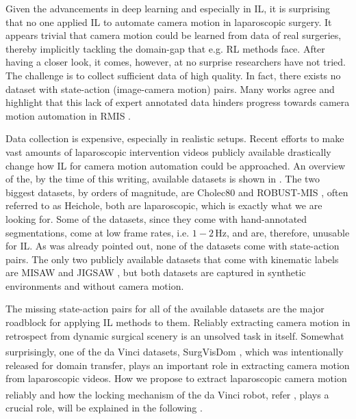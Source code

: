 Given the advancements in deep learning and especially in IL, it is surprising that no one applied IL to automate camera motion in laparoscopic surgery. It appears trivial that camera motion could be learned from data of real surgeries, thereby implicitly tackling the domain-gap that e.g. RL methods face. After having a closer look, it comes, however, at no surprise researchers have not tried. The challenge is to collect sufficient data of high quality. In fact, there exists no dataset with state-action (image-camera motion) pairs. Many works agree and highlight that this lack of expert annotated data hinders progress towards camera motion automation in RMIS \cite{maier2022surgical,kassahun2016surgical,esteva2019guide}.

Data collection is expensive, especially in realistic setups. Recent efforts to make vast amounts of laparoscopic intervention videos publicly available \cite{maier2022surgical} drastically change how IL for camera motion automation could be approached. An overview of the, by the time of this writing, available datasets is shown in . The two biggest datasets, by orders of magnitude, are Cholec80 \cite{twinanda2016endonet} and ROBUST-MIS \cite{maier2020heidelberg}, often referred to as Heichole, both are laparoscopic, which is exactly what we are looking for. Some of the datasets, since they come with hand-annotated segmentations, come at low frame rates, i.e. $1-2\,\text{Hz}$, and are, therefore, unusable for IL. As was already pointed out, none of the datasets come with state-action pairs. The only two publicly available datasets that come with kinematic labels are MISAW \cite{mitsuishi2013master} and JIGSAW \cite{ahmidi2017dataset}, but both datasets are captured in synthetic environments and without camera motion.

The missing state-action pairs for all of the available datasets are the major roadblock for applying IL methods to them. Reliably extracting camera motion in retrospect from dynamic surgical scenery is an unsolved task in itself. Somewhat surprisingly, one of the da Vinci\textsuperscript{\textregistered} datasets, SurgVisDom \cite{zia2021surgical}, which was intentionally released for domain transfer, plays an important role in extracting camera motion from laparoscopic videos. How we propose to extract laparoscopic camera motion reliably and how the locking mechanism of the da Vinci\textsuperscript{\textregistered} robot, refer , plays a crucial role, will be explained in the following .



